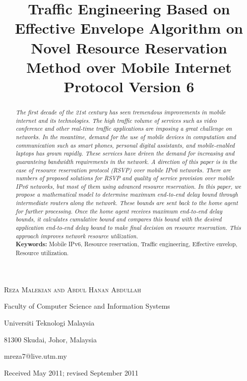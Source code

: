 \documentclass[12pt,a4paper]{ijicic}
\title[Traffic Engineering on a Novel resource reservation over Mobile IPv6]
      {Traffic Engineering Based on Effective Envelope Algorithm on Novel Resource Reservation Method over Mobile Internet Protocol Version 6}
\author[R. Malekian and A. H. Abdullah]{}
\begin{document}
\maketitle

\centerline{\scshape  Reza Malekian and  Abdul Hanan Abdullah}
 \medskip
{\footnotesize
\centerline{Faculty of Computer Science and Information Systems}
\centerline{Universiti Teknologi Malaysia}
\centerline{81300 Skudai, Johor, Malaysia}
\centerline{mreza7@live.utm.my} }
\medskip




\centerline{Received May 2011; revised September 2011}


\medskip



\begin{abstract}

{\em The first decade of the 21st century has seen tremendous improvements in mobile internet and its technologies. The high traffic volume of services such as video conference and other real-time traffic applications are imposing a great challenge on networks. In the meantime, demand for the use of mobile devices in computation and communication such as smart phones, personal digital assistants, and mobile-enabled laptops has grown rapidly. These services have driven the demand for increasing and guaranteing bandwidth requirements in the network. A direction of this paper is in the case of resource reservation protocol (RSVP) over mobile IPv6 networks. There are numbers of proposed solutions for RSVP and quality of service provision over mobile IPv6 networks, but most of them using advanced resource reservation. In this paper, we propose a mathematical model to determine maximum end-to-end delay bound through intermediate routers along the network. These bounds are sent back to the home agent for further processing. Once the home agent receives maximum end-to-end delay bounds, it calculates cumulative bound and compares this bound with the desired application end-to-end delay bound to make final decision on resource reservation. This approach improves network resource utilization. }\\
{\bf Keywords:} Mobile IPv6, Resource reservation, Traffic engineering, Effective envelop, Resource utilization.

\end{abstract}
\end{document}
